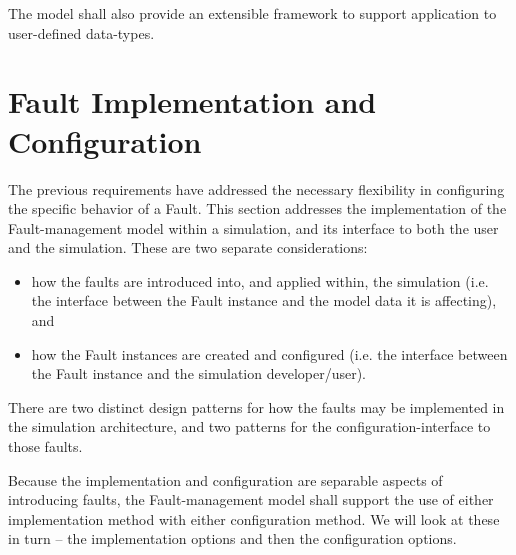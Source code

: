 \documentclass[11pt,fleqn]{report}
\begin{document}
The model shall also provide an extensible framework to support application to
user-defined data-types.

\section {Fault Implementation and Configuration}
The previous requirements have addressed the necessary flexibility in
configuring the specific behavior of a Fault. This section addresses the
implementation of the Fault-management model within a simulation, and its
interface to both the user and the simulation. These are two separate
considerations:
\begin{itemize}
  \item how the faults are introduced into, and applied within,
  the simulation (i.e. the interface between the Fault instance and the model
  data it is affecting), and
  \item how the Fault instances are created and configured (i.e. the interface
  between the Fault instance and the simulation developer/user).
\end{itemize}

There are two distinct design patterns for how the faults may be implemented
in the simulation architecture, and two patterns for the
configuration-interface to those faults.

Because the implementation and configuration are separable aspects of
introducing faults, the Fault-management model shall support the use of either
implementation method with either configuration method.
We will look at these in turn -- the
implementation options and then the configuration options.
\end{document}
